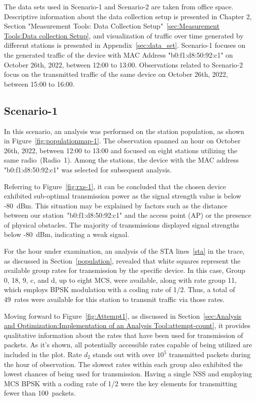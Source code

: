 The data sets used in Scenario-1 and Scenario-2 are taken from office space. Descriptive information about the data collection setup is presented in Chapter 2, Section "Measurement Tools: Data Collection Setup"~\ref{sec:Measurement Tools:Data collection Setup}, and visualization of traffic over time generated by different stations is presented in Appendix~\ref{sec:data_set}. Scenario-1 focuses on the generated traffic of the device with MAC Address "b0:f1:d8:50:92:c1" on October 26th, 2022, between 12:00 to 13:00. Observations related to Scenario-2 focus on the transmitted traffic of the same device on October 26th, 2022, between 15:00 to 16:00.

\newpage
\subsection{Scenario-1 }
\label{sec:Analysis and Optimization:Performance Evaluation:Scenario1}

In this scenario, an analysis was performed on the station population, as shown in Figure~\ref{fig:populationmap-1}. The observation spanned an hour on October 26th, 2022, between 12:00 to 13:00 and focused on eight stations utilizing the same radio~(Radio~1). Among the stations, the device with the MAC address "b0:f1:d8:50:92:c1" was selected for subsequent analysis.

Referring to Figure~\ref{fig:rxs-1}, it can be concluded that the chosen device exhibited sub-optimal transmission power as the signal strength value is below -80~dBm. This situation may be explained by factors such as the distance between our station~"b0:f1:d8:50:92:c1" and the access point (AP) or the presence of physical obstacles. The majority of transmissions displayed signal strengths below -80~dBm, indicating a weak signal.

For the hour under examination, an analysis of the STA lines~\ref{sta} in the trace, as discussed in Section~\ref{population}, revealed that white squares represent the available group rates for transmission by the specific device. In this case, Group 0, 18, 9, c, and d, up to eight MCS, were available, along with rate group 11, which employs BPSK modulation with a coding rate of 1/2. Thus, a total of 49~rates were available for this station to transmit traffic via those rates.

Moving forward to Figure~\ref{fig:Attempt1}, as discussed in Section~\ref{sec:Analysis and Optimization:Implementation of an Analysis Tool:attempt-count}, it provides qualitative information about the rates that have been used for transmission of packets. As it's shown, all potentially accessible rates capable of being utilized are included in the plot. Rate $d_2$ stands out with over $10^5$ transmitted packets during the hour of observation. The slowest rates within each group also exhibited the lowest chances of being used for transmission. Having a single NSS and employing MCS BPSK with a coding rate of 1/2 were the key elements for transmitting fewer than 100~packets.

